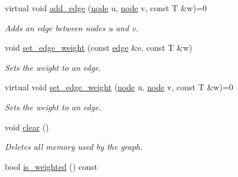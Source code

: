\begin{DoxyCompactItemize}
virtual void \hyperlink{classlgraph_1_1utils_1_1wxgraph_a2cc33d25e8e593fa48cc05fdf0e96f9f}{add\-\_\-edge} (\hyperlink{namespacelgraph_1_1utils_a7bd66ede3805ef121bc2835bd48de0cf}{node} u, \hyperlink{namespacelgraph_1_1utils_a7bd66ede3805ef121bc2835bd48de0cf}{node} v, const T \&w)=0
\begin{DoxyCompactList}\small\item\em Adds an edge between nodes {\itshape u} and {\itshape v}. \end{DoxyCompactList}\item 
void \hyperlink{classlgraph_1_1utils_1_1wxgraph_a7db98bd89ecabcf4b700780568a9a719}{set\-\_\-edge\-\_\-weight} (const \hyperlink{namespacelgraph_1_1utils_a6510284ce1b1ae5dc97ce5d2de426e10}{edge} \&e, const T \&w)
\begin{DoxyCompactList}\small\item\em Sets the weight to an edge. \end{DoxyCompactList}\item 
virtual void \hyperlink{classlgraph_1_1utils_1_1wxgraph_aa86ab2541c10f8e0e6bdd1e737e54ae6}{set\-\_\-edge\-\_\-weight} (\hyperlink{namespacelgraph_1_1utils_a7bd66ede3805ef121bc2835bd48de0cf}{node} u, \hyperlink{namespacelgraph_1_1utils_a7bd66ede3805ef121bc2835bd48de0cf}{node} v, const T \&w)=0
\begin{DoxyCompactList}\small\item\em Sets the weight to an edge. \end{DoxyCompactList}\item 
void \hyperlink{classlgraph_1_1utils_1_1wxgraph_a421bc8166e35335445e45efc680ebe3f}{clear} ()
\begin{DoxyCompactList}\small\item\em Deletes all memory used by the graph. \end{DoxyCompactList}\item 
\hypertarget{classlgraph_1_1utils_1_1wxgraph_adda596cfbf72080d46ab445679fe092f}{bool \hyperlink{classlgraph_1_1utils_1_1wxgraph_adda596cfbf72080d46ab445679fe092f}{is\-\_\-weighted} () const }\label{classlgraph_1_1utils_1_1wxgraph_adda596cfbf72080d46ab445679fe092f}


\end{DoxyCompactItemize}
